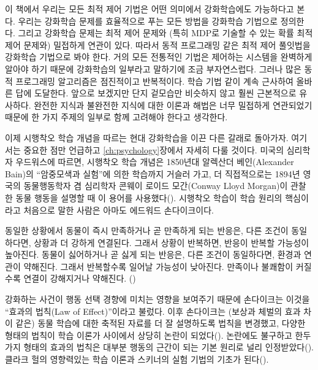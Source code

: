 이 책에서 우리는 모든 최적 제어 기법은 어떤 의미에서 강화학습에도 가능하다고
본다. 우리는 강화학습 문제를 효율적으로 푸는 모든 방법을 강화학습 기법으로
정의한다. 그리고 강화학습 문제는 최적 제어 문제와 (특히 MDP로 기술할 수 있는
확률 최적 제어 문제와) 밀접하게 연관이 있다. 따라서 동적 프로그래밍 같은 최적
제어 풀잇법을 강화학습 기법으로 봐야 한다. 거의 모든 전통적인 기법은 제어하는
시스템을 완벽하게 알아야 하기 때문에 강화학습의 일부라고 말하기에 조금
부자연스럽다. 그러나 많은 동적 프로그래밍 알고리즘은 점진적이고 반복적이다. 학습
기법 같이 계속 근사하여 올바른 답에 도달한다. 앞으로 보겠지만 단지 겉모습만
비슷하지 않고 훨씬 근본적으로 유사하다. 완전한 지식과 불완전한 지식에 대한
이론과 해법은 너무 밀접하게 연관되었기 때문에 한 가지 주제의 일부로 함께
고려해야 한다고 생각한다.

이제 시행착오 학습 개념을 따르는 현대 강화학습을 이끈 다른 갈래로 돌아가자.
여기서는 중요한 점만 언급하고 \ref{ch:psychology}장에서 자세히 다룰 것이다.
미국의 심리학자 우드워스에 따르면, 시행착오 학습 개념은 1850년대 알렉산더
베인(Alexander Bain)의 ``암중모색과 실험''에 의한 학습까지 거슬러 가고, 더
직접적으로는 1894년 영국의 동물행동학자 겸 심리학자 콘웨이 로이드 모간(Conway
Lloyd Morgan)이 관찰한 동물 행동을 설명할 때 이 용어를
사용했다(\cite{Woodworth1938}). 시행착오 학습이 학습 원리의 핵심이라고 처음으로
말한 사람은 아마도 에드워드 손다이크이다.


\begin{displayquote}
동일한 상황에서 동물이 즉시 만족하거나 곧 만족하게 되는 반응은, 다른 조건이
동일하다면, 상황과 더 강하게 연결된다. 그래서 상황이 반복하면, 반응이 반복할
가능성이 높아진다. 동물이 싫어하거나 곧 싫게 되는 반응은, 다른 조건이
동일하다면, 환경과 연관이 약해진다. 그래서 반복할수록 일어날 가능성이 낮아진다.
만족이나 불쾌함이 커질수록 연결이 강해지거나 약해진다.
(\cite[p.~244]{Thorndike1911})
\end{displayquote}

강화하는 사건이 행동 선택 경향에 미치는 영향을 보여주기 때문에 손다이크는 이것을
``효과의 법칙(Law of Effect)''이라고 불렀다. 이후 손다이크는 (보상과 체벌의 효과
차이 같은) 동물 학습에 대한 축적된 자료를 더 잘 설명하도록 법칙을 변경했고,
다양한 형태의 법칙이 학습 이론가 사이에서 상당히 논란이
되었다(\cite[예,][참고]{Gallistel2005, Herrnstein1970, Kimble1961, Kimble1967,
Mazur1994}). 논란에도 불구하고 한두 가지 형태의 효과의 법칙은 대부분 행동의
근간이 되는 기본 원리로 널리 인정받았다(\cite[예,][]{HilgardBower1975,
Dennett1978, Campbell1960, Cziko1995}). 클라크 헐의 영향력있는 학습 이론과
스키너의 실험 기법의 기초가 된다(\cite[예,][]{Hull1943, Skinner1938}).

